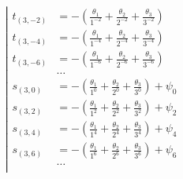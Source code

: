 \begin{equation*} \left| \begin{aligned}
t_{(3,-2)} &=
- \left(
  \frac{\theta_1}{1^{-2}}
+ \frac{\theta_2}{2^{-2}}
+ \frac{\theta_3}{3^{-2}} \right) \\
%
t_{(3,-4)} &=
- \left(
  \frac{\theta_1}{1^{-4}}
+ \frac{\theta_2}{2^{-4}}
+ \frac{\theta_3}{3^{-4}} \right) \\
%
t_{(3,-6)} &=
- \left(
  \frac{\theta_1}{1^{-6}}
+ \frac{\theta_2}{2^{-6}}
+ \frac{\theta_3}{3^{-6}} \right) \\
%
&\ldots \\
%
s_{(3,0)} &=
- \left(
  \frac{\theta_1}{1^0}
+ \frac{\theta_2}{2^0}
+ \frac{\theta_3}{3^0} \right)
+ \psi_0 \\
%
s_{(3,2)} &=
- \left(
  \frac{\theta_1}{1^2}
+ \frac{\theta_2}{2^2}
+ \frac{\theta_3}{3^2} \right)
+ \psi_2 \\
%
s_{(3,4)} &=
- \left(
  \frac{\theta_1}{1^4}
+ \frac{\theta_2}{2^4}
+ \frac{\theta_3}{3^4} \right)
+ \psi_4 \\
%
s_{(3,6)} &=
- \left(
  \frac{\theta_1}{1^6}
+ \frac{\theta_2}{2^6}
+ \frac{\theta_3}{3^6} \right)
+ \psi_6 \\
%
&\ldots \\
\end{aligned} \right. \end{equation*}